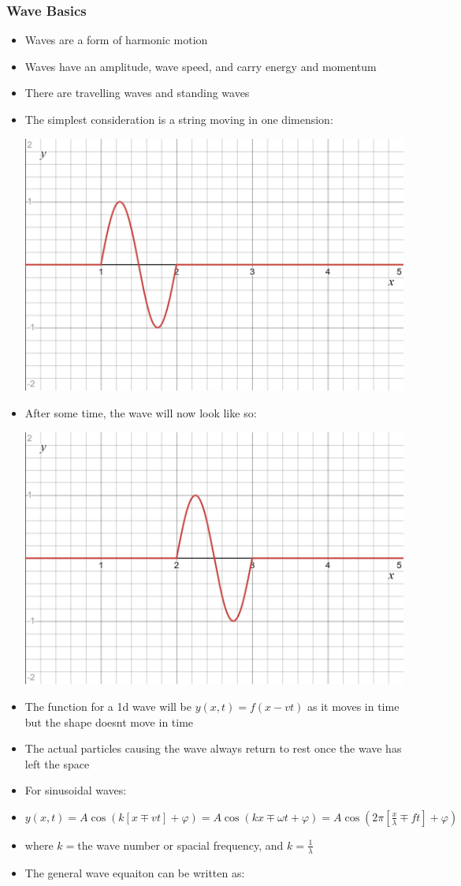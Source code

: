 \documentclass{article}
\begin{document}
\subsubsection*{Wave Basics}
\begin{itemize}
    \item Waves are a form of harmonic motion
    \item Waves have an amplitude, wave speed, and carry energy and momentum
    \item There are travelling waves and standing waves
    \item The simplest consideration is a string moving in one dimension:

    \includegraphics[width=.5\linewidth]{year1/wfmp/waves/basic string wave.png}
    \item After some time, the wave will now look like so:
    
    \includegraphics[width = .5\linewidth]{year1/wfmp/waves/basic string wave 2.png}
    \item The function for a 1d wave will be \(y(x, t)=f(x-vt)\) as it moves in time but the shape doesnt move in time
    \item The actual particles causing the wave always return to rest once the wave has left the space
    \item For sinusoidal waves:
    \item \(y(x, t)=A\cos(k[x\mp vt]+\varphi)=A\cos(kx\mp\omega t+\varphi)=A\cos(2\pi[\frac{x}{\lambda}\mp ft]+\varphi)\)
    \item where \(k=\)the wave number or spacial frequency, and \(k=\frac{1}{\lambda}\)

    \item The general wave equaiton can be written as:
\end{itemize}
\end{document}
